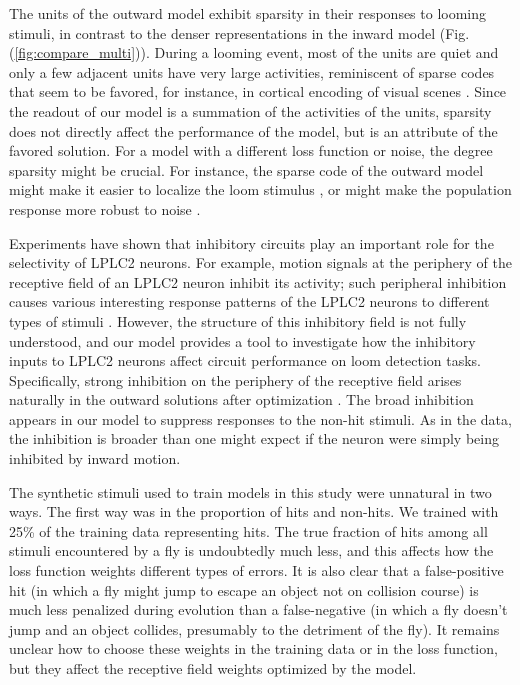 \documentclass[pdftex,9pt,lineno]{elife}
\begin{document}
The units of the outward model exhibit sparsity in their responses to looming stimuli, in contrast to the denser representations in the inward model (Fig. (\ref{fig:compare_multi})). During a looming event, most of the units are quiet and only a few adjacent units have very large activities, reminiscent of sparse codes that seem to be favored, for instance, in cortical encoding of visual scenes \citep{olshausen1996emergence,olshausen1997sparse}. Since the readout of our model is a summation of the activities of the units, sparsity does not directly affect the performance of the model, but is an attribute of the favored solution. For a model with a different loss function or noise, the degree sparsity might be crucial. For instance, the sparse code of the outward model might make it easier to localize the loom stimulus \citep{morimoto2020spatial}, or might make the population response more robust to noise \citep{field1994goal}. 

Experiments have shown that inhibitory circuits play an important role for the selectivity of LPLC2 neurons. For example, motion signals at the periphery of the receptive field of an LPLC2 neuron inhibit its activity; such peripheral inhibition causes various interesting response patterns of the LPLC2 neurons to different types of stimuli \citep{klapoetke2017ultra}. However, the structure of this inhibitory field is not fully understood, and our model provides a tool to investigate how the inhibitory inputs to LPLC2 neurons affect circuit performance on loom detection tasks. Specifically, strong inhibition on the periphery of the receptive field arises naturally in the outward solutions after optimization \citep{klapoetke2017ultra}. The broad inhibition appears in our model to suppress responses to the non-hit stimuli. As in the data, the inhibition is broader than one might expect if the neuron were simply being inhibited by inward motion.

The synthetic stimuli used to train models in this study were unnatural in two ways. The first way was in the proportion of hits and non-hits. We trained with 25\% of the training data representing hits. The true fraction of hits among all stimuli encountered by a fly is undoubtedly much less, and this affects how the loss function weights different types of errors. It is also clear that a false-positive hit (in which a fly might jump to escape an object not on collision course) is much less penalized during evolution than a false-negative (in which a fly doesn't jump and an object collides, presumably to the detriment of the fly). It remains unclear how to choose these weights in the training data or in the loss function, but they affect the receptive field weights optimized by the model.
\end{document}
